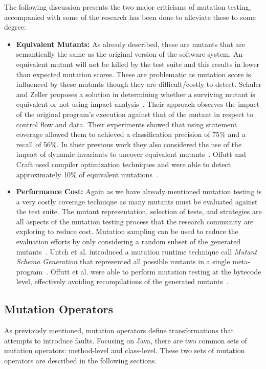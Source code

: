 The following discussion presents the two major criticisms of mutation testing, accompanied with some of the research has been done to alleviate these to some degree:

\begin{itemize}
  \item \textbf{Equivalent Mutants:} As already described, these are mutants that are semantically the same as the original version of the software system. An equivalent mutant will not be killed by the test suite and this results in lower than expected mutation scores. These are problematic as mutation score is influenced by these mutants though they are difficult/costly to detect. Schuler and Zeller proposes a solution in determining whether a surviving mutant is equivalent or not using impact analysis~\cite{SZ10}. Their approach observes the impact of the original program's execution against that of the mutant in respect to control flow and data. Their experiments showed that using statement coverage allowed them to achieved a classification precision of 75\% and a recall of 56\%. In their previous work they also considered the use of the impact of dynamic invariants to uncover equivalent mutants~\cite{SDZ09}. Offutt and Craft used compiler optimization techniques and were able to detect approximately 10\% of equivalent mutations~\cite{OC94}.
  \item \textbf{Performance Cost:} Again as we have already mentioned mutation testing is a very costly coverage technique as many mutants must be evaluated against the test suite. The mutant representation, selection of tests, and strategies are all aspects of the mutation testing process that the research community are exploring to reduce cost. Mutation sampling can be used to reduce the evaluation efforts by only considering a random subset of the generated mutants~\cite{Bud80}. Untch et al. introduced a mutation runtime technique call \emph{Mutant Schema Generation} that represented all possible mutants in a single meta-program~\cite{UOH93}. Offutt et al. were able to perform mutation testing at the bytecode level, effectively avoiding recompilations of the generated mutants~\cite{OMK04}.
\end{itemize}


\subsection{Mutation Operators}
\label{subsec:background_mutation_operators}
As previously mentioned, mutation operators define transformations that attempts to introduce faults. Focusing on Java, there are two common sets of mutation operators: method-level and class-level. These two sets of mutation operators are described in the following sections.


